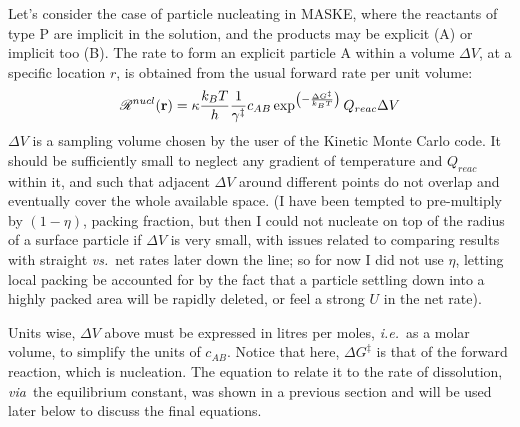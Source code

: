 \documentclass[12pt]{paper}    %
\newcommand{\RR}{\mathscr{R}}
\newcommand{\ie}{\textit{i.e.}~}
\newcommand{\via}{\textit{via}~}
\newcommand{\vs}{\textit{vs.}~}
\begin{document}
Let's consider the case of particle nucleating in MASKE, where the reactants of type P are implicit in the solution, and the products may be explicit (A) or implicit too (B). The rate to form an explicit particle A within a volume $\Delta V$, at a specific location $r$, is obtained from the usual forward rate per unit volume:
%
\begin{eqnarray}
\RR^{nucl}({\bf r}) = \kappa \frac{k_BT}{h} \frac{1}{\gamma^\ddag} c_{AB} \exp^{\left( - \frac{\Delta G^\ddag}{k_BT}\right)} Q_{reac} \Delta V   
\end{eqnarray}
%
$\Delta V$ is a sampling volume chosen by the user of the Kinetic Monte Carlo code. It should be sufficiently small to neglect any gradient of temperature and $Q_{reac}$ within it, and such that adjacent $\Delta V$ around different points do not overlap and eventually cover the whole available space. (I have been tempted to pre-multiply by $(1-\eta)$, packing fraction, but then I could not nucleate on top of the radius of a surface particle if $\Delta V$ is very small, with issues related to comparing results with straight \vs net rates later down the line; so for now I did not use $\eta$, letting local packing be accounted for by the fact that a particle settling down into a highly packed area will be rapidly deleted, or feel a strong $U$ in the net rate). 

Units wise, $\Delta V$ above must be expressed in litres per moles, \ie as a molar volume, to simplify the units of $c_{AB}$. Notice that here, $\Delta G^\ddag$ is that of the forward reaction, which is nucleation. The equation to relate it to the rate of dissolution, \via the equilibrium constant, was shown in a previous section and will be used later below to discuss the final equations.
\end{document}
